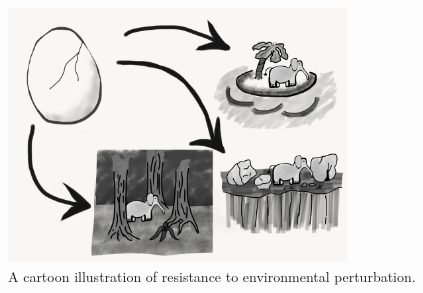 \begin{figure} \label{fig:elephant_developmental_perturbation}
  \includegraphics[width=0.8\textwidth]{img/elephant_developmental_perturbation.jpg}
  \captionsetup{singlelinecheck=off,justification=raggedright}

  \caption{A cartoon illustration of resistance to environmental perturbation.}
\end{figure}